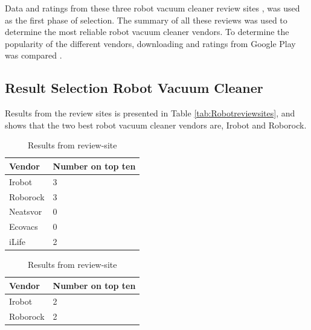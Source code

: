 Data and ratings from these three robot vacuum cleaner review sites \cite{robotsel11}\cite{robotsel12}\cite{robotsel13}, was used  as the first phase of selection. The summary of all these reviews was used to determine the most reliable robot vacuum cleaner vendors. To determine the popularity of the different vendors, downloading and ratings from Google Play was compared \cite{GooglePlay}.

\subsection{Result Selection Robot Vacuum Cleaner}

Results from the review sites is presented in Table \ref{tab:Robotreviewsites}, and shows that the two best robot vacuum cleaner vendors are, Irobot and Roborock.
\begin{table}[H]
    \centering
    \begin{subtable}[b]{0.45\linewidth}
        \centering
        \caption{Results from review-site \cite{robotsel11}}
        \begin{tabular}{|l|l|}
            \hline 
            \textbf{Vendor} & \textbf{Number on top ten} \\ \hline
            Irobot      & 3                 \\                   \hline
            Roborock    & 3                 \\                   \hline
            Neatsvor    & 0                 \\                   \hline
            Ecovacs     & 0                 \\                   \hline
            iLife       & 2                 \\                   \hline
        \end{tabular}
    \end{subtable}
    \hspace{0.5cm}
    \begin{subtable}[b]{0.45\linewidth}
        \centering
        \caption{Results from review-site \cite{robotsel12}}
        \begin{tabular}{|l|l|}
            \hline
            \textbf{Vendor}    & \textbf{Number on top ten} \\ \hline
            Irobot      & 2                 \\                   \hline
            Roborock    & 2                 \\                   \hline

\end{tabular}
\end{subtable}
\end{table}
